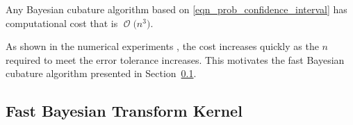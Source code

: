 \documentclass{svjour3}                     %
\DeclareMathOperator{\Order}{{\mathcal O}}
\newcommand{\bm}[1]{\boldsymbol{#1}}
\newcommand{\vtheta}{{\bm{\theta}}}
\newcommand{\vt}{\bm{t}}
\newcommand{\vx}{\bm{x}}
\newcommand{\mC}{\mathsf{C}}
\newcommand{\opt}{{\textup{opt}}}
\begin{document}
Any Bayesian cubature algorithm based on \eqref{eqn_prob_confidence_interval} has  computational cost that is $\Order\bigl( n^3 \bigr)$.

As shown in the numerical experiments \cite{JagHic19a}, the cost increases quickly as the $n$ required to meet the error tolerance increases.  This motivates the fast Bayesian cubature algorithm presented in Section~\ref{sec:fast_BC}.





















\subsection{Fast Bayesian Transform Kernel}
\label{sec:fast_BC}
\end{document}
